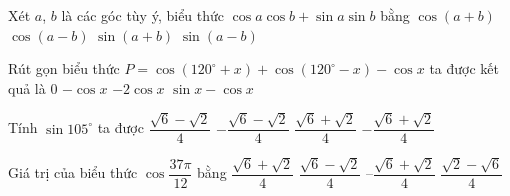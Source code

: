 \begin{ex}%
	Xét $a$, $b$  là các góc tùy ý, biểu thức $\cos a\cos b+\sin a\sin b$ bằng
	 \choice
		{$\cos (a+b)$} 
		{\True $\cos  (a-b)$}
		{$\sin  (a+b)$}
		 {$\sin (a-b)$}
\end{ex}

\begin{ex}%
	Rút  gọn biểu thức $P=\cos \left(120^{\circ}+x\right)+\cos \left(120^{\circ}-x\right)-\cos x$ ta được kết quả là
	 \choice
		 {$0$}
		{$-\cos x$} 
		 {\True $-2\cos x$}
		{$\sin x-\cos  x$}
\end{ex}

\begin{ex}%
	 Tính $\sin 105^\circ$ ta được
	\choice 
		 {$\dfrac{\sqrt{6}-\sqrt{2}}{4}$}
		 {$-\dfrac{\sqrt{6}-\sqrt{2}}{4}$}
		{\True $\dfrac{\sqrt{6}+\sqrt{2}}{4}$} 
		{$-\dfrac{\sqrt{6}+\sqrt{2}}{4}$} 
\end{ex}

\begin{ex}%
	Giá trị của biểu thức $\cos \dfrac{37\pi}{12}$ bằng 
	 \choice
		 {$\dfrac{\sqrt{6}+\sqrt{2}}{4}$}
		 {$\dfrac{\sqrt{6}-\sqrt{2}}{4}$}
		{\True--$\dfrac{\sqrt{6}+\sqrt{2}}{4}$} 
		{$\dfrac{\sqrt{2}-\sqrt{6}}{4}$} 
\end{ex}

